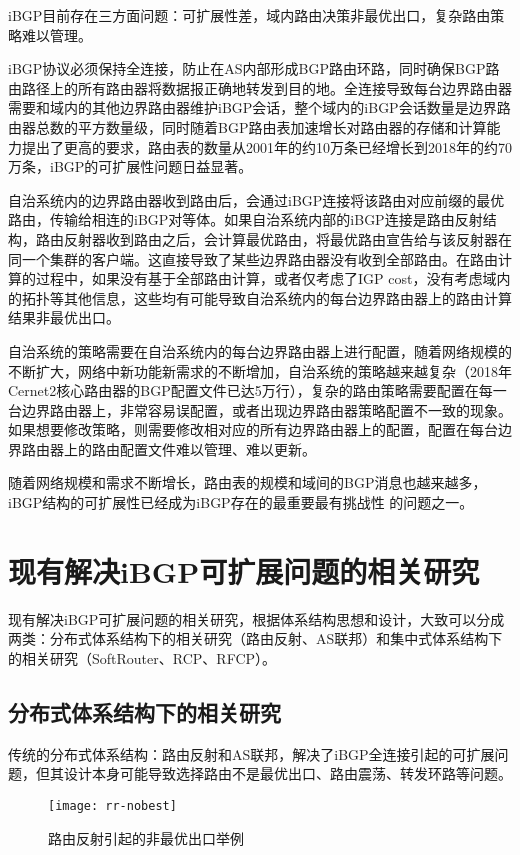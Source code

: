 iBGP\cite{Oprescu2011Rethinking}目前存在三方面问题：可扩展性差，域内路由决策非最优出口，复杂路由策略难以管理。

iBGP协议必须保持全连接，防止在AS内部形成BGP路由环路，同时确保BGP路由路径上的所有路由器将数据报正确地转发到目的地。全连接导致每台边界路由器需要和域内的其他边界路由器维护iBGP会话，整个域内的iBGP会话数量是边界路由器总数的平方数量级，同时随着BGP路由表加速增长对路由器的存储和计算能力提出了更高的要求，路由表的数量从2001年的约10万条已经增长到2018年的约70万条，iBGP的可扩展性问题日益显著。

自治系统内的边界路由器收到路由后，会通过iBGP连接将该路由对应前缀的最优路由，传输给相连的iBGP对等体。如果自治系统内部的iBGP连接是路由反射结构，路由反射器收到路由之后，会计算最优路由，将最优路由宣告给与该反射器在同一个集群的客户端。这直接导致了某些边界路由器没有收到全部路由。在路由计算的过程中，如果没有基于全部路由计算，或者仅考虑了IGP cost，没有考虑域内的拓扑等其他信息，这些均有可能导致自治系统内的每台边界路由器上的路由计算结果非最优出口。

自治系统的策略需要在自治系统内的每台边界路由器上进行配置，随着网络规模的不断扩大，网络中新功能新需求的不断增加，自治系统的策略越来越复杂（2018年Cernet2核心路由器的BGP配置文件已达5万行），复杂的路由策略需要配置在每一台边界路由器上，非常容易误配置，或者出现边界路由器策略配置不一致的现象。如果想要修改策略，则需要修改相对应的所有边界路由器上的配置，配置在每台边界路由器上的路由配置文件难以管理、难以更新。

随着网络规模和需求不断增长，路由表的规模和域间的BGP消息也越来越多，iBGP结构的可扩展性已经成为iBGP存在的最重要最有挑战性 的问题之一。


\section{现有解决iBGP可扩展问题的相关研究}
现有解决iBGP可扩展问题的相关研究，根据体系结构思想和设计，大致可以分成两类：分布式体系结构下的相关研究（路由反射\cite{rfc2796}、AS联邦\cite{rfc1965}）和集中式体系结构下的相关研究（SoftRouter\cite{lakshman2004}、RCP\cite{Feamster2004The}、RFCP\cite{Rothenberg}）。

\subsection{分布式体系结构下的相关研究}
传统的分布式体系结构：路由反射和AS联邦，解决了iBGP全连接引起的可扩展问题，但其设计本身可能导致选择路由不是最优出口、路由震荡、转发环路等问题。

\begin{figure}
  \centering
  \texttt{[image: rr-nobest]}
  \caption{路由反射引起的非最优出口举例\cite{Feamster2004The}}
  \label{fig:rr-nobest}
\end{figure}

